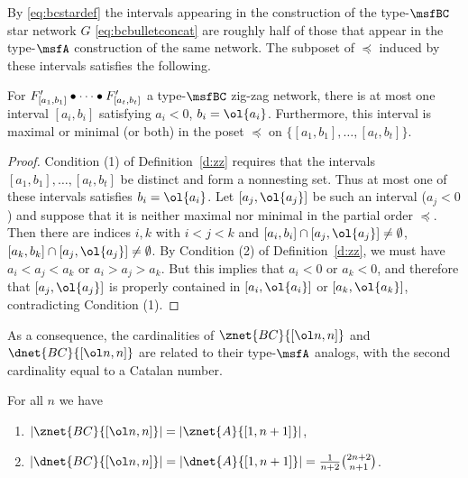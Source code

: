 By \eqref{eq:bcstardef} the intervals appearing in the construction
of the type-$\msfBC$ star network $G$ \eqref{eq:bcbulletconcat}
are roughly half of those that appear in the type-$\msfA$ construction
of the same network.  The subposet of $\preceq$ induced by these intervals
satisfies the following.
\begin{prop}\label{p:atmostonesymminterval}
  For $F'_{\smash{[a_1,b_1]}} \bullet \cdots \bullet F'_{\smash{[a_t,b_t]}}$ 
  a type-$\msfBC$ zig-zag network,
  there is at most one interval $[a_i, b_i]$
  satisfying $a_i < 0$, $b_i = \ol{a_i}$.
  Furthermore, this interval is maximal or minimal
  (or both) in the poset $\preceq$ on $\{ [a_1,b_1], \dotsc, [a_t,b_t] \}$.
\end{prop}
\begin{proof}
  Condition (1) of Definition~\ref{d:zz} requires that the intervals
  $[a_1,b_1], \dotsc, [a_t,b_t]$ be distinct and form a nonnesting set.
  Thus at most one of these intervals satisfies $b_i = \ol{a_i}$.
  Let $[a_j,\ol{a_j}]$ be such an interval ($a_j < 0$) and suppose that
  it is neither maximal nor minimal in the partial order $\preceq$.
  Then there are indices $i, k$ with $i < j < k$ and
  $[a_i,b_i] \cap [a_j,\ol{a_j}] \neq \emptyset$,
  $[a_k,b_k] \cap [a_j,\ol{a_j}] \neq \emptyset$.  By Condition (2)
  of Definition~\ref{d:zz}, we must have $a_i < a_j < a_k$
  or $a_i > a_j > a_k$.  But this implies that $a_i < 0$ or $a_k < 0$, and
  therefore that $[a_j, \ol{a_j}]$ is properly contained in $[a_i, \ol{a_i}]$
  or $[a_k,\ol{a_k}]$, contradicting Condition (1).
  \end{proof}
As a consequence, the cardinalities of $\znet{BC}{[\ol n,n]}$ and
$\dnet{BC}{[\ol n,n]}$ are related to their type-$\msfA$ analogs,
with the second cardinality equal to a Catalan number.
\begin{thm}\label{t:catalan}
  For all $n$ we have
  \begin{enumerate}
  \item $|\znet{BC}{[\ol n,n]}| = |\znet{A}{[1,n+1]}|$,
  \item $|\dnet{BC}{[\ol n,n]}| = |\dnet{A}{[1,n+1]}| = \frac1{n+2} \tbinom{2n+2}{n+1}$.
    \end{enumerate}
\end{thm}
